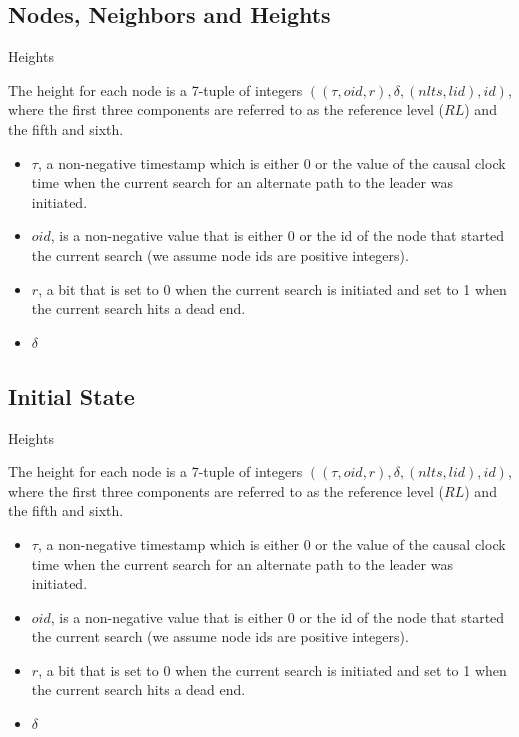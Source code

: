 \documentclass{beamer}
\begin{document}
\subsection{Nodes, Neighbors and Heights}
\begin{frame}{Heights}

The height for each node is a 7-tuple of integers $((\tau , oid, r), \delta, (nlts, lid), id)$, where the first three components are referred to as the reference level ($RL$) and the fifth and sixth.

\begin{itemize}
	\item $\tau$, a non-negative timestamp which is either 0 or the value of the causal clock time when the current search for an alternate path to the leader was initiated.
	\item $oid$, is a non-negative value that is either 0 or the id of the node that started the current search (we assume node ids are positive integers).
	\item $r$, a bit that is set to 0 when the current search is initiated and set to 1 when the current search hits a dead end.
	\item $\delta$

\end{itemize}

\end{frame}

\subsection{Initial State}
\begin{frame}{Heights}

The height for each node is a 7-tuple of integers $((\tau , oid, r), \delta, (nlts, lid), id)$, where the first three components are referred to as the reference level ($RL$) and the fifth and sixth.

\begin{itemize}
	\item $\tau$, a non-negative timestamp which is either 0 or the value of the causal clock time when the current search for an alternate path to the leader was initiated.
	\item $oid$, is a non-negative value that is either 0 or the id of the node that started the current search (we assume node ids are positive integers).
	\item $r$, a bit that is set to 0 when the current search is initiated and set to 1 when the current search hits a dead end.
	\item $\delta$


\end{itemize}

\end{frame}
\end{document}
